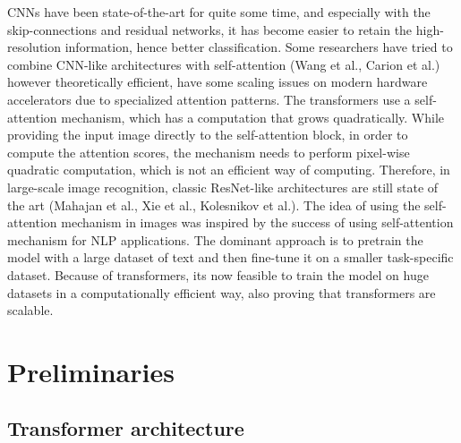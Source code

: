 \documentclass[conference]{IEEEtran}
\begin{document}
CNNs have been state-of-the-art for quite some time, and especially with the skip-connections and residual networks, it has become easier to retain the high-resolution information, hence better classification. Some researchers have tried to combine CNN-like architectures with self-attention (Wang et al., Carion et al.) however theoretically efficient, have some scaling issues on modern hardware accelerators due to specialized attention patterns. The transformers use a self-attention mechanism, which has a computation that grows quadratically. While providing the input image directly to the self-attention block, in order to compute the attention scores, the mechanism needs to perform pixel-wise quadratic computation, which is not an efficient way of computing. Therefore, in large-scale image recognition, classic ResNet-like architectures are still state of the art (Mahajan et al., Xie et al., Kolesnikov et al.). The idea of using the self-attention mechanism in images was inspired by the success of using self-attention mechanism for NLP applications. The dominant approach is to pretrain the model with a large dataset of text and then fine-tune it on a smaller task-specific dataset. Because of transformers, its now feasible to train the model on huge datasets in a computationally efficient way, also proving that transformers are scalable. 
 

\section{Preliminaries}

\subsection{Transformer architecture}
\end{document}
